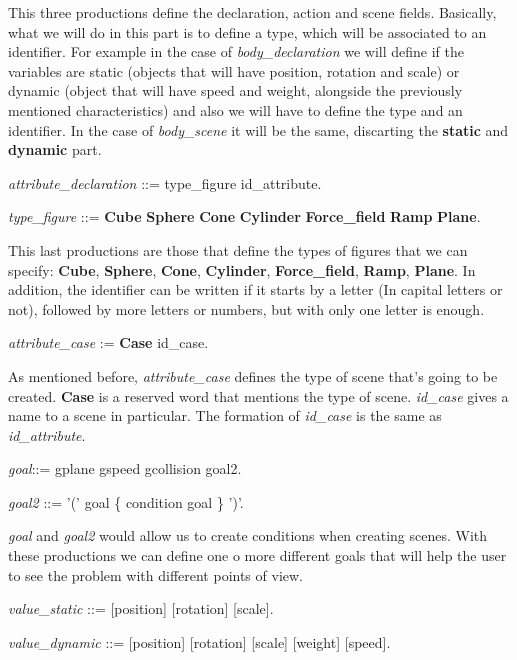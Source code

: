 \documentclass[12pt]{article}
\begin{document}
This three productions define the declaration, action and scene fields. Basically, what we will do in this part is to define a type, which will be associated to an identifier. For example in the case of \textit{body\_declaration} we will define if the variables are static (objects that will have position, rotation and scale) or dynamic (object that will have speed and weight, alongside the previously mentioned characteristics) and also we will have to define the type and an identifier. In the case of \textit{body\_scene} it will be the same, discarting the \textbf{static} and \textbf{dynamic} part.

\noindent \textit{attribute\_declaration} ::= type\_figure id\_attribute.

\noindent \textit{type\_figure} ::= \textbf{Cube} \textbar \textbf{Sphere} \textbar \textbf{Cone} \textbar \textbf{Cylinder} \textbar \textbf{Force\_field} \textbar \textbf{Ramp} \textbar  \textbf{Plane}.

This last productions are those that define the types of figures that we can specify: \textbf{Cube}, \textbf{Sphere}, \textbf{Cone}, \textbf{Cylinder}, \textbf{Force\_field}, \textbf{Ramp}, \textbf{Plane}. In addition, the identifier can be written if it starts by a letter (In capital letters or not), followed by more letters or numbers, but with only one letter is enough.

\noindent \textit{attribute\_case} := \textbf{Case} id\_case.

As mentioned before, \textit{attribute\_case} defines the type of scene that's going to be created. \textbf{Case} is a reserved word that mentions the type of scene. \textit{id\_case} gives a name to a scene in particular. The formation of \textit{id\_case} is the same as \textit{id\_attribute}.

\noindent \textit{goal}::=  gplane \textbar gspeed \textbar gcollision \textbar goal2.

\noindent \textit{goal2} ::= '(' goal \{ condition goal \} ')'.

\textit{goal} and \textit{goal2} would allow us to create conditions when creating scenes. With these productions we can define one o more different goals that will help the user to see the problem with different points of view.

\noindent \textit{value\_static} ::= [position] [rotation] [scale].

\noindent \textit{value\_dynamic} ::= [position] [rotation] [scale] [weight] [speed].
\end{document}
